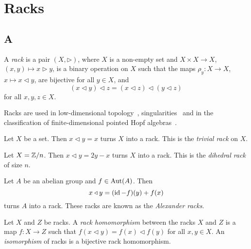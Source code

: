 \chapter{Racks}

\section*{A}

\begin{definition}
\label{defn:rack}
A \emph{rack} is a pair $(X,\triangleright)$, 
where $X$ is a non-empty set and 
$X\times X\to X$, $(x,y)\mapsto x\triangleright y$, is a binary operation on $X$ such that
the maps $\rho_y\colon X\to X$, $x\mapsto x\triangleleft y$, are bijective for all $y\in X$, and 
\begin{equation}
\label{eq:rack}
(x\triangleleft y)\triangleleft z=(x\triangleleft z)\triangleleft (y\triangleleft z)
\end{equation}
for all $x,y,z\in X$.
\end{definition}

Racks are used in low-dimensional topology~\cite{MR3379534}, singularities~\cite{MR975077} 
and in the classification of finite-dimensional pointed Hopf algebras~\cite{MR1994219}.

\begin{example}
    Let $X$ be a set. Then $x\triangleleft y=x$ turns $X$ into a rack. 
    This is the \emph{trivial rack} on $X$. 
\end{example}

\begin{example}
    Let $X=\mathbb{Z}/n$. Then $x\triangleleft y=2y-x$ turns $X$ into a rack. This is 
    the \emph{dihedral rack} of size $n$. 
\end{example}

\begin{example}
    Let $A$ be an abelian group and $f\in\operatorname{Aut}(A)$. Then 
    \[
    x\triangleleft y=(\operatorname{id}-f)(y)+f(x)
    \]
    turns $A$ into a rack. These racks 
    are known as the \emph{Alexander racks}.
\end{example}

\begin{definition}
    Let $X$ and $Z$ be racks. 
    A \emph{rack homomorphism} between the racks $X$ and $Z$ is a map $f\colon X\to Z$ such that 
    $f(x\triangleleft y)=f(x)\triangleleft f(y)$ for all $x,y\in X$. 
    An \emph{isomorphism} of racks is a bijective rack homomorphism. 
\end{definition}

